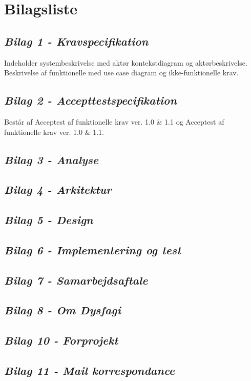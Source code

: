 \chapter{Bilagsliste}
\section*{\textit{Bilag 1 - Kravspecifikation}} \label{bilag1}
Indeholder systembeskrivelse med aktør kontekstdiagram og aktørbeskrivelse. Beskrivelse af funktionelle med use case diagram og ikke-funktionelle krav.
\section*{\textit{Bilag 2 - Accepttestspecifikation}} \label{bilag2}
Består af Acceptest af funktionelle krav ver. 1.0 \& 1.1 og Acceptest af funktionelle krav ver. 1.0 \& 1.1.
\section*{\textit{Bilag 3 - Analyse}} \label{bilag3}

\section*{\textit{Bilag 4 - Arkitektur}} \label{bilag4}
\section*{\textit{Bilag 5 - Design}} \label{bilag5}
\section*{\textit{Bilag 6 - Implementering og test}} \label{bilag6}
\section*{\textit{Bilag 7 - Samarbejdsaftale}} \label{bilag7}
\section*{\textit{Bilag 8 - Om Dysfagi}} \label{bilag8}
\section*{\textit{Bilag 10 - Forprojekt}} \label{bilag10}
\section*{\textit{Bilag 11 - Mail korrespondance}} \label{bilag11}
